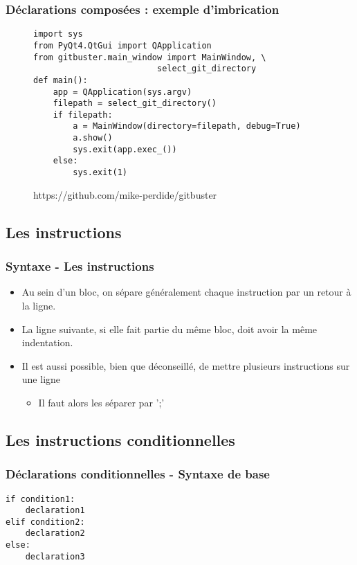 \begin{frame}[fragile]
  \frametitle{Déclarations composées : exemple d'imbrication}
\begin{figure}
\tiny{\begin{lstlisting}import sys
from PyQt4.QtGui import QApplication
from gitbuster.main_window import MainWindow, \
                         select_git_directory
def main():
    app = QApplication(sys.argv)
    filepath = select_git_directory()
    if filepath:
        a = MainWindow(directory=filepath, debug=True)
        a.show()
        sys.exit(app.exec_())
    else:
        sys.exit(1)
  \end{lstlisting}}
\def\figurename{Code source de gitbuster}
\caption{https://github.com/mike-perdide/gitbuster}
\end{figure}
\end{frame}

\subsection{Les instructions}
\begin{frame}
  \frametitle{Syntaxe - Les instructions}
  \begin{itemize}
    \item<1-> Au sein d'un bloc, on sépare généralement chaque instruction par un retour à la ligne.
    \item<2-> La ligne suivante, si elle fait partie du même bloc, doit avoir la même indentation.
    \item<3-> Il est aussi possible, bien que déconseillé, de mettre plusieurs instructions sur une ligne
    \begin{itemize}
      \item<4-> Il faut alors les séparer par ';'
    \end{itemize}
  \end{itemize}
\end{frame}

\subsection{Les instructions conditionnelles}
\begin{frame}[fragile]
  \frametitle{Déclarations conditionnelles - Syntaxe de base}
  \begin{lstlisting}
if condition1:
    declaration1
elif condition2:
    declaration2
else:
    declaration3
  \end{lstlisting}
\end{frame}

